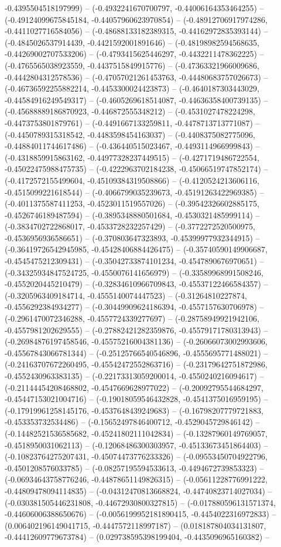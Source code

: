 -0.4395504518197999) -- (-0.4932241670700797, -0.44006164353464255) -- (-0.49124099675845184, -0.44057960623970854) -- (-0.48912706917974286, -0.4411027716584056) -- (-0.48688133182389315, -0.44162972835393144) -- (-0.4845026537914439, -0.4421592001891646) -- (-0.48198982594568635, -0.44269002707533206) -- (-0.4793415625446297, -0.4432211478362225) -- (-0.4765565038923559, -0.4437515849915776) -- (-0.47363321966009686, -0.4442804312578536) -- (-0.47057021261453763, -0.44480683757026673) -- (-0.46736592255882214, -0.4453300024423873) -- (-0.4640187303443029, -0.44584916249549317) -- (-0.4605269618514087, -0.44636358400739135) -- (-0.45688889186870923, -0.446872555348212) -- (-0.4531027478224298, -0.4473753801879761) -- (-0.4491667133259811, -0.4478713713771087) -- (-0.4450789315318542, -0.4483598454163037) -- (-0.4408375082775096, -0.44884011744617486) -- (-0.436440515023467, -0.4493114966999843) -- (-0.4318859915863162, -0.44977328237449515) -- (-0.4271719486722554, -0.45022475988475735) -- (-0.4222963702184238, -0.45066519747852174) -- (-0.4172572155499604, -0.45109384319508866) -- (-0.4120524213606116, -0.4515099221618544) -- (-0.4066799035239673, -0.45191263422969385) -- (-0.4011375587411253, -0.4523011519557026) -- (-0.39542326602885175, -0.4526746189487594) -- (-0.3895348880501684, -0.4530321485999114) -- (-0.3834702722868017, -0.4533728232257429) -- (-0.3772272520500975, -0.4536956936586651) -- (-0.370803647323893, -0.45399977932344915) -- (-0.36419726542945985, -0.45428406884426475) -- (-0.35740590149906687, -0.4545475212309431) -- (-0.35042733874101234, -0.4547890676970651) -- (-0.34325934847524725, -0.4550076141656979) -- (-0.33589968991508246, -0.4552020445210479) -- (-0.32834610966709843, -0.45537122466584357) -- (-0.3205963409184714, -0.4555140074447523) -- (-0.31264810227874, -0.4556292384934277) -- (-0.30449909624186394, -0.4557157630706978) -- (-0.2961470072346288, -0.4557724339277697) -- (-0.28758949921942106, -0.4557981202629555) -- (-0.27882421282359876, -0.45579171780313943) -- (-0.26984876197458546, -0.45575216004381136) -- (-0.26066073002993606, -0.45567843066781344) -- (-0.25125766540546896, -0.4555695771488021) -- (-0.24163707672260495, -0.45542472552863716) -- (-0.23179642751872986, -0.4552430963383135) -- (-0.22173313059200014, -0.4550240216094617) -- (-0.21144454208468802, -0.4547669628977022) -- (-0.20092795544684297, -0.45447153021004716) -- (-0.19018059546432828, -0.4541375016959195) -- (-0.17919961258145176, -0.4537648439249683) -- (-0.16798207779721883, -0.453353732534486) -- (-0.15652497846400712, -0.4529045729846142) -- (-0.14482521536585682, -0.45241802111042834) -- (-0.13287960149769057, -0.4518950031062113) -- (-0.12068486300303957, -0.45133673451864403) -- (-0.10823764275207431, -0.45074473776233326) -- (-0.09553450704922796, -0.4501208576033785) -- (-0.08257195594533613, -0.4494672739853323) -- (-0.06934643758776246, -0.44878651149826315) -- (-0.05611228776991222, -0.44809478094114835) -- (-0.04312470813668824, -0.44740823714027034) -- (-0.030381505446231808, -0.44672930800327815) -- (-0.017880596131571374, -0.44606006388650676) -- (-0.0056199952181890415, -0.4454022316972833) -- (0.006402196149041715, -0.4447572118997187) -- (0.018187804034131807, -0.44412609779673784) -- (0.029738595398199404, -0.4435096965160382) -- 